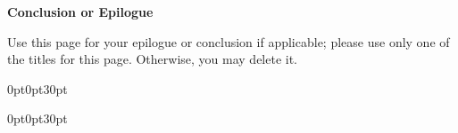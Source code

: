 \documentclass[12pt]{report}   %
\begin{document}


\begin{center}
\pagebreak
\vspace*{5\baselineskip}
\textbf{\large Conclusion or Epilogue}
\end{center}


\begin{flushleft}
\hspace{10mm}Use this page for your epilogue or conclusion if applicable; please use only one of the titles for this page. Otherwise, you may delete it.
\end{flushleft}








\titlespacing*{\chapter}
  {0pt}{0pt}{30pt}

\begin{singlespace}  %
	\setlength\bibitemsep{\baselineskip}  %
	\printbibliography[title={References}]
\end{singlespace}



\titlespacing*{\chapter}
  {0pt}{0pt}{30pt}	%
  
\end{document}
